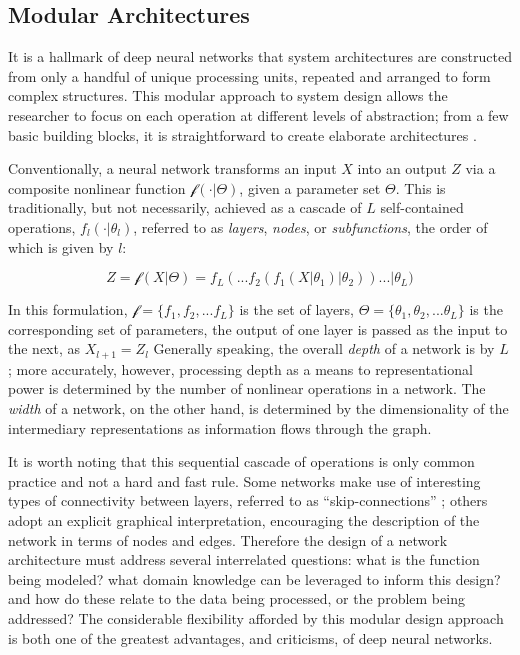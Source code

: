 \subsection{Modular Architectures}
\label{subsec:architectures}

It is a hallmark of deep neural networks that system architectures are constructed from only a handful of unique processing units, repeated and arranged to form complex structures.
This modular approach to system design allows the researcher to focus on each operation at different levels of abstraction;
from a few basic building blocks, it is straightforward to create elaborate architectures \cite{inceptionnet}.

Conventionally, a neural network transforms an input $X$ into an output $Z$ via a composite nonlinear function $\mathcal{f}(\cdot \vert \Theta)$, given a parameter set $\Theta$.
This is traditionally, but not necessarily, achieved as a cascade of $L$ self-contained operations, $f_l(\cdot \vert \theta_l)$, referred to as \emph{layers}, \emph{nodes}, or \emph{subfunctions}, the order of which is given by $l$:

\begin{equation}
\label{eq:layers}
Z = \mathcal{f}(X \vert \Theta) = f_{L}(  ... f_2(f_1(X \vert \theta_1) \vert \theta_2) ) ... \vert \theta_{L})
\end{equation}

\noindent In this formulation, $\mathcal{f} = \{f_1, f_2, ... f_{L} \}$ is the set of layers, $\Theta = \{\theta_1, \theta_2, ... \theta_{L} \}$ is the corresponding set of parameters, the output of one layer is passed as the input to the next, as $X_{l+1} = Z_{l}$
Generally speaking, the overall \emph{depth} of a network is by $L$;
more accurately, however, processing depth as a means to representational power is determined by the number of nonlinear operations in a network.
The \emph{width} of a network, on the other hand, is determined by the dimensionality of the intermediary representations as information flows through the graph.

It is worth noting that this sequential cascade of operations is only common practice and not a hard and fast rule.
Some networks make use of interesting types of connectivity between layers, referred to as ``skip-connections'' \cite{LeCun};
others adopt an explicit graphical interpretation, encouraging the description of the network in terms of nodes and edges.
Therefore the design of a network architecture must address several interrelated questions:
what is the function being modeled?
what domain knowledge can be leveraged to inform this design?
and how do these relate to the data being processed, or the problem being addressed?
The considerable flexibility afforded by this modular design approach is both one of the greatest advantages, and criticisms, of deep neural networks.

